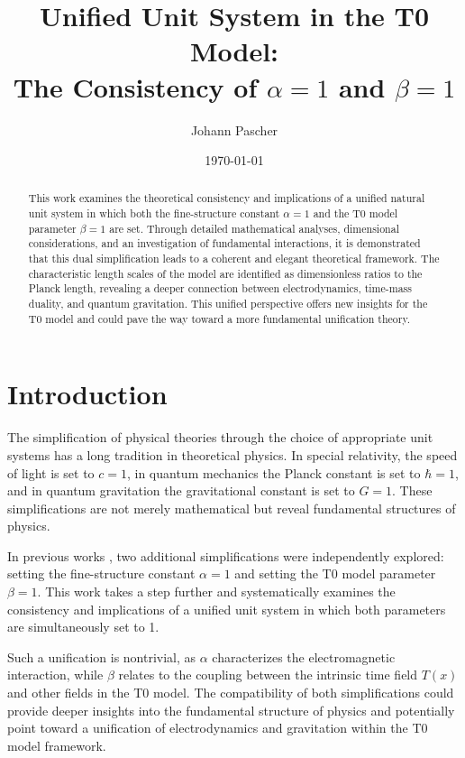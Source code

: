 ﻿\documentclass[12pt,a4paper]{article}
\title{Unified Unit System in the T0 Model: \\The Consistency of \(\alpha = 1\) and \(\beta = 1\)}
\author{Johann Pascher}
\date{\today}
\newcommand{\Tfield}{T(x)}
\begin{document}
	
	\maketitle
	
	\begin{abstract}
		This work examines the theoretical consistency and implications of a unified natural unit system in which both the fine-structure constant \(\alpha = 1\) and the T0 model parameter \(\beta = 1\) are set. Through detailed mathematical analyses, dimensional considerations, and an investigation of fundamental interactions, it is demonstrated that this dual simplification leads to a coherent and elegant theoretical framework. The characteristic length scales of the model are identified as dimensionless ratios to the Planck length, revealing a deeper connection between electrodynamics, time-mass duality, and quantum gravitation. This unified perspective offers new insights for the T0 model and could pave the way toward a more fundamental unification theory.
	\end{abstract}
	
	\tableofcontents
	\newpage
	
	\section{Introduction}
	
	The simplification of physical theories through the choice of appropriate unit systems has a long tradition in theoretical physics. In special relativity, the speed of light is set to \(c = 1\), in quantum mechanics the Planck constant is set to \(\hbar = 1\), and in quantum gravitation the gravitational constant is set to \(G = 1\). These simplifications are not merely mathematical but reveal fundamental structures of physics.
	
	In previous works \cite{pascher_alpha_2025, pascher_beta_2025}, two additional simplifications were independently explored: setting the fine-structure constant \(\alpha = 1\) and setting the T0 model parameter \(\beta = 1\). This work takes a step further and systematically examines the consistency and implications of a unified unit system in which both parameters are simultaneously set to 1.
	
	Such a unification is nontrivial, as \(\alpha\) characterizes the electromagnetic interaction, while \(\beta\) relates to the coupling between the intrinsic time field \(\Tfield\) and other fields in the T0 model. The compatibility of both simplifications could provide deeper insights into the fundamental structure of physics and potentially point toward a unification of electrodynamics and gravitation within the T0 model framework.
	
\end{document}
